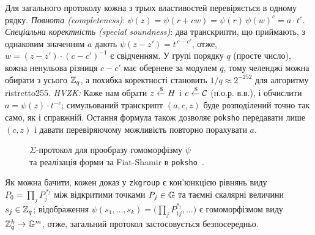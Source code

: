 Для загального протоколу кожна з трьох властивостей перевіряється в одному рядку. \emph{Повнота (completeness)}: 
$\psi(z) = \psi(r+cw) = \psi(r)\,\psi(w)^{c} = a\cdot t^{c}$. \emph{Спеціальна коректність (special soundness)}: 
два транскрипти, що приймають, з однаковим значенням $a$ дають $\psi(z-z') = t^{\,c-c'}$, отже, $w = (z-z')\cdot(c-c')^{-1}$ 
є свідченням. У групі порядку $q$ (просте число), кожна ненульова різниця $c-c'$ має обернене за модулем $q$, тому 
челенджі можна обирати з усього $\mathbb{Z}_q$, а похибка коректності становить $1/q\approx 2^{-252}$ для алгоритму 
ristretto255. \emph{HVZK:} Каже нам обрати $z\xleftarrow{\$} H$ і $c\xleftarrow{\$}\mathcal{C}$ (н.о.р. в.в.), і обчислити $a=\psi(z)\cdot t^{-c}$; 
симульований транскрипт $(a,c,z)$ буде розподілений точно так само, як і справжній. Остання формула також 
дозволяє \texttt{poksho} передавати лише $(c,z)$ і давати перевіряючому можливість повторно порахувати $a$.

\begin{figure}[!ht]
  \centering
  \begin{minipage}{0.8\linewidth}
    \centering
    
    \caption{$\Sigma$-протокол для прообразу гомоморфізму $\psi$~\cite{SigmaProtocols} \\
      та реалізація форми за Fiat-Shamir в \texttt{poksho}~\cite{libsignal}.}
    \label{fig:sigma}
  \end{minipage}
\end{figure}

Як можна бачити, кожен доказ у \texttt{zkgroup} є кон'юнкцією рівнянь виду $P_0 = \prod_j P_j^{\,s_j}$ між 
відкритими точками $P_j\in\mathbb{G}$ та таємні скалярні величини $s_j\in\mathbb{Z}_q$; відображення $\psi(s_1,\dots,s_k) = \bigl(\prod_j P_{1j}^{s_j},\dots\bigr)$ 
є гомоморфізмом виду $\mathbb{Z}_q^k \to \mathbb{G}^m$, отже, загальний протокол застосовується безпосередньо.

